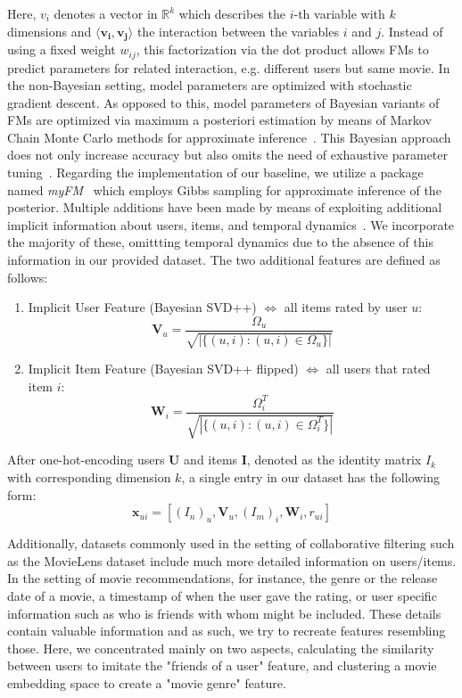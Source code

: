 \documentclass[10pt,conference,compsocconf]{IEEEtran}
\begin{document}
    Here, $v_i$ denotes a vector in $\mathbb{R}^k$ which describes the $i$-th variable with $k$ dimensions and $\langle \mathbf{v_i},\mathbf{v_j} \rangle$ the interaction between the variables $i$ and $j$.
    Instead of using a fixed weight $w_{ij}$, this factorization via the dot product allows FMs to predict parameters for related interaction, e.g. different users but same movie.
    In the non-Bayesian setting, model parameters are optimized with stochastic gradient descent.
    As opposed to this, model parameters of Bayesian variants of FMs are optimized via maximum a posteriori estimation by means of Markov Chain Monte Carlo methods for approximate inference~\cite{salakhutdinov_bayesian_2008}.
    This Bayesian approach does not only increase accuracy but also omits the need of exhaustive parameter tuning~\cite{freudenthaler_bayesian_2011}.
    Regarding the implementation of our baseline, we utilize a package named \textit{myFM}~\cite{noauthor_myfm_nodate} which employs Gibbs sampling for approximate inference of the posterior.
    Multiple additions have been made by means of exploiting additional implicit information about users, items, and temporal dynamics~\cite{rendle_scaling_2013,koren_factorization_2008,koren_collaborative_2009}.
    We incorporate the majority of these, omittting temporal dynamics due to the absence of this information in our provided dataset.
    The two additional features are defined as follows:
    \begin{enumerate}
        \item Implicit User Feature (Bayesian SVD++) $\Leftrightarrow$ all items rated by user $u$:
        $$\mathbf{V}_u=\frac{\Omega_u}{\sqrt{|\{(u,i): (u,i) \in \Omega_u\}|}}$$
        \item Implicit Item Feature (Bayesian SVD++ flipped) $\Leftrightarrow$ all users that rated item $i$:
        $$\mathbf{W}_i=\frac{\Omega^T_i}{\sqrt{|\{(u,i): (u,i) \in \Omega^T_i\}|}}$$
    \end{enumerate}
    After one-hot-encoding users $\mathbf{U}$ and items $\mathbf{I}$, denoted as the identity matrix $I_k$ with corresponding dimension $k$, a single entry in our dataset has the following form:
    $$\mathbf{x}_{ui} = [(I_n)_u,\mathbf{V}_u,(I_m)_i,\mathbf{W}_i, r_{ui}]$$

    Additionally, datasets commonly used in the setting of collaborative filtering such as the MovieLens dataset include much more detailed information on users/items.
    In the setting of movie recommendations, for instance, the genre or the release date of a movie, a timestamp of when the user gave the rating, or user specific information such as who is friends with whom might be included.
    These details contain valuable information and as such, we try to recreate features resembling those. %
    Here, we concentrated mainly on two aspects, calculating the similarity between users to imitate the "friends of a user" feature, and clustering a movie embedding space to create a "movie genre" feature.
\end{document}
